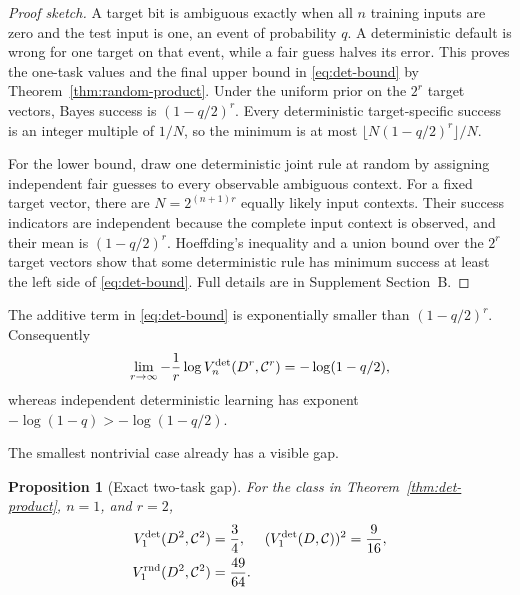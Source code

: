 \documentclass[twoside]{article}
\newtheorem{proposition}[theorem]{Proposition}
\newcommand{\cC}{\mathcal C}
\begin{document}
\begin{proof}[Proof sketch]
A target bit is ambiguous exactly when all $n$ training inputs are zero and the test input is one, an event of probability $q$. A deterministic default is wrong for one target on that event, while a fair guess halves its error. This proves the one-task values and the final upper bound in \eqref{eq:det-bound} by Theorem~\ref{thm:random-product}. Under the uniform prior on the $2^r$ target vectors, Bayes success is $(1-q/2)^r$. Every deterministic target-specific success is an integer multiple of $1/N$, so the minimum is at most $\lfloor N(1-q/2)^r\rfloor/N$.

For the lower bound, draw one deterministic joint rule at random by assigning independent fair guesses to every observable ambiguous context. For a fixed target vector, there are $N=2^{(n+1)r}$ equally likely input contexts. Their success indicators are independent because the complete input context is observed, and their mean is $(1-q/2)^r$. Hoeffding's inequality and a union bound over the $2^r$ target vectors show that some deterministic rule has minimum success at least the left side of \eqref{eq:det-bound}. Full details are in Supplement Section~B.
\end{proof}

The additive term in \eqref{eq:det-bound} is exponentially smaller than $(1-q/2)^r$. Consequently \[ \lim_{r\to\infty}-\frac1r\log V_n^{\rm det}(D^r,\cC^r)=-\log(1-q/2), \] whereas independent deterministic learning has exponent $-\log(1-q)>-\log(1-q/2)$.

The smallest nontrivial case already has a visible gap.

\begin{proposition}[Exact two-task gap]\label{prop:two-task}
For the class in Theorem~\ref{thm:det-product}, $n=1$, and $r=2$,
\begin{align*}
V_1^{\rm det}(D^2,\cC^2)&=\frac34, &
(V_1^{\rm det}(D,\cC))^2&=\frac9{16},\\
V_1^{\rm rnd}(D^2,\cC^2)&=\frac{49}{64}.&&
\end{align*}
\end{proposition}
\end{document}
